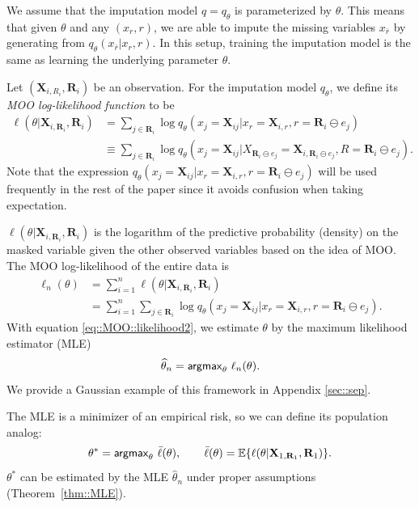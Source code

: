 \documentclass[aos, preprint]{imsart}
\theoremstyle{plain}
\theoremstyle{definition}
\let\hat\widehat
\newcommand{\E}{\mbox{$\mathbb{E}$}}
\newcommand{\bX}{\mathbf{X}}
\newcommand{\bR}{\mathbf{R}}
\begin{document}
We assume that the imputation model $q  = q_\theta$ is parameterized by $\theta$. 
This means that given $\theta$ and
any $(x_r,r)$, we are able to impute the missing variables $x_{\bar r}$ by generating from $q_\theta(x_{\bar r}|x_r,r)$.
In this setup, training the imputation model is the same as learning the underlying parameter $\theta$.

Let $(\bX_{i,R_i}, \bR_i)$ be an observation.
For the imputation model $q_\theta$,
we define its \emph{MOO log-likelihood function} to be 
\begin{equation}
\begin{aligned}
\ell(\theta|\bX_{i,\bR_i},\bR_i) 
&= \sum_{j \in \bR_i} \log q_\theta(x_j = \bX_{ij}| x_r = \bX_{i, r},  r= \bR_i\ominus e_j)\\
&\equiv \sum_{j \in \bR_i} \log q_\theta(x_j = \bX_{ij}|X_{\bR_i\ominus e_j} = \bX_{i, \bR_i\ominus e_j}, R = \bR_i\ominus e_j).
\end{aligned}
\label{eq::MOO::likelihood}
\end{equation}
Note that the expression 
$
q_\theta(x_j = \bX_{ij}| x_r = \bX_{i, r},  r= \bR_i\ominus e_j)
$
will be used frequently in the rest of the paper 
since it avoids confusion when taking expectation.


$\ell(\theta|\bX_{i,\bR_i},\bR_i)$ is the logarithm of the predictive probability (density) on the masked variable
given the other observed variables based on the idea of MOO. 
The {MOO log-likelihood} of the entire data is 
\begin{equation}
\begin{aligned}
\ell_n(\theta)&=  \sum_{i=1}^n \ell(\theta|\bX_{i,\bR_i},\bR_i)  \\
&= \sum_{i=1}^n\sum_{j \in \bR_i} \log q_\theta(x_j = \bX_{ij}|x_r =  \bX_{i, r}, r=\bR_i\ominus e_j).
\end{aligned}
\label{eq::MOO::likelihood2}
\end{equation}
With equation \eqref{eq::MOO::likelihood2}, we  estimate $\theta$ by the maximum likelihood estimator (MLE)
\begin{equation}
\hat \theta_n = {\sf argmax}_\theta \,\,\ell_n(\theta).
\label{eq::MLE}
\end{equation}
We provide a Gaussian example of this framework in Appendix \ref{sec::sep}.

The MLE is a minimizer of an empirical risk, so we can define its population analog:
\begin{equation}
\theta^*  = {\sf argmax}_\theta  \,\, \bar \ell(\theta), \qquad \bar \ell(\theta) = \E\{\ell(\theta|\bX_{1,\bR_1},\bR_1)\}.
\label{eq::pMLE}
\end{equation}
$\theta^*$ can be estimated by the MLE $\hat \theta_n$ under proper assumptions (Theorem~\ref{thm::MLE}).
\end{document}
